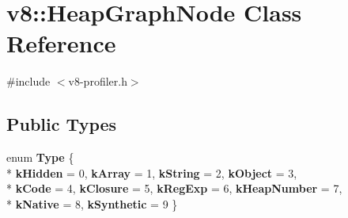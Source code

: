 \hypertarget{classv8_1_1_heap_graph_node}{}\section{v8\+:\+:Heap\+Graph\+Node Class Reference}
\label{classv8_1_1_heap_graph_node}


{\ttfamily \#include $<$v8-\/profiler.\+h$>$}

\subsection*{Public Types}
\begin{DoxyCompactItemize}
\item 
\hypertarget{classv8_1_1_heap_graph_node_ab674a58103a51abc56f99edc6a1479ed}{}enum {\bfseries Type} \{ \\*
{\bfseries k\+Hidden} = 0, 
{\bfseries k\+Array} = 1, 
{\bfseries k\+String} = 2, 
{\bfseries k\+Object} = 3, 
\\*
{\bfseries k\+Code} = 4, 
{\bfseries k\+Closure} = 5, 
{\bfseries k\+Reg\+Exp} = 6, 
{\bfseries k\+Heap\+Number} = 7, 
\\*
{\bfseries k\+Native} = 8, 
{\bfseries k\+Synthetic} = 9
 \}\label{classv8_1_1_heap_graph_node_ab674a58103a51abc56f99edc6a1479ed}

\end{DoxyCompactItemize}
